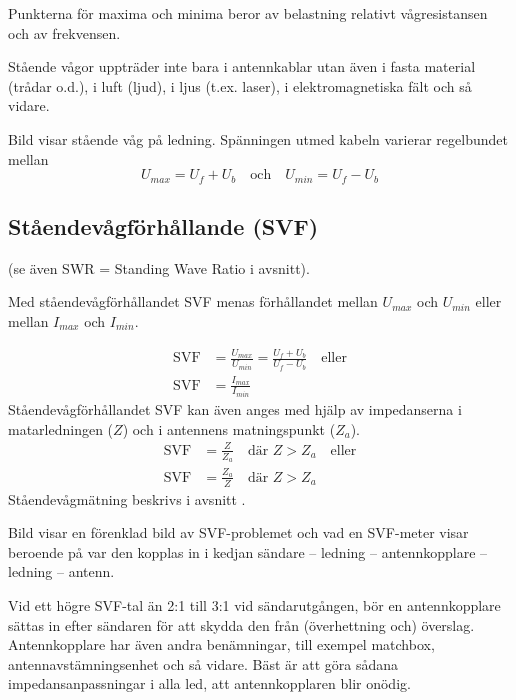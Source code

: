 Punkterna för maxima och minima beror av belastning relativt
vågresistansen och av frekvensen.

Stående vågor uppträder inte bara i antennkablar utan även i fasta material
(trådar o.d.), i luft (ljud), i ljus (t.ex. laser), i elektromagnetiska fält
och så vidare.

Bild  visar stående våg på ledning.
Spänningen utmed kabeln varierar regelbundet mellan
\[U_{max} = U_f + U_b \quad \text{och} \quad U_{min} = U_f - U_b\]


\subsection{Ståendevågförhållande (SVF)}

(se även SWR = Standing Wave Ratio i avsnitt).

Med ståendevågförhållandet SVF menas förhållandet mellan \(U_{max}\)
och \(U_{min}\) eller mellan \(I_{max}\) och \(I_{min}\).

\begin{align*}
  \text{SVF} &= \frac{U_{max}}{U_{min}} = \frac{U_f + U_b}{U_f - U_b} \quad
  \text{eller} \\
  \text{SVF} &= \frac{I_{max}}{I_{min}}
\end{align*}
Ståendevågförhållandet SVF kan även anges med hjälp av impedanserna i
matarledningen (\(Z\)) och i antennens matningspunkt (\(Z_a\)).
\begin{align*}
  \text{SVF} &= \frac{Z}{Z_a} \quad \text{där } Z > Z_a \quad \text{eller} \\
  \text{SVF} &= \frac{Z_a}{Z} \quad \text{där } Z > Z_a
\end{align*}
Ståendevågmätning beskrivs i avsnitt .


Bild  visar en förenklad bild av SVF-problemet och vad en
SVF-meter visar beroende på var den kopplas in i kedjan sändare -- ledning --
antennkopplare -- ledning -- antenn.

Vid ett högre SVF-tal än 2:1 till 3:1 vid sändarutgången, bör en antennkopplare
sättas in efter sändaren för att skydda den från (överhettning och) överslag.
Antennkopplare har även andra benämningar, till exempel matchbox,
antennavstämningsenhet och så vidare.
Bäst är att göra sådana impedansanpassningar i alla led, att antennkopplaren
blir onödig.

